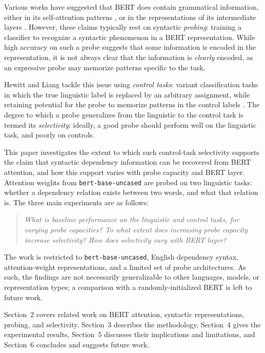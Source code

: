 \documentclass[12pt,a4paper]{article}
\begin{document}
Various works have suggested that BERT does contain grammatical information, either in its self-attention patterns \cite{clark2019what}, or in the representations of its intermediate layers \cite{tenney2019bert}. However, these claims typically rest on syntactic \emph{probing}: training a classifier to recognize a syntactic phenomenon in a BERT representation. While high accuracy on such a probe suggests that some information is encoded in the representation, it is not always clear that the information is \emph{clearly} encoded, as an expressive probe may memorize patterns specific to the task.

Hewitt and Liang tackle this issue using \emph{control tasks}: variant classification tasks in which the true linguistic label is replaced by an arbitrary assignment, while retaining potential for the probe to memorize patterns in the control labels \cite{hewitt2019designing}. The degree to which a probe generalizes from the linguistic to the control task is termed its \emph{selectivity}: ideally, a good probe should perform well on the linguistic task, and poorly on controls.

This paper investigates the extent to which such control-task selectivity supports the claim that syntactic dependency information can be recovered from BERT attention, and how this support varies with probe capacity and BERT layer. Attention weights from \texttt{bert-base-uncased} are probed on two linguistic tasks: whether a dependency relation exists between two words, and what that relation is. The three main experiments are as follows:

\begin{quote}

\textit{What is baseline performance on the linguistic and control tasks, for varying probe capacities? To what extent does increasing probe capacity increase selectivity? How does selectivity vary with BERT layer?}

\end{quote}

The work is restricted to \texttt{bert-base-uncased}, English dependency syntax, attention-weight representations, and a limited set of probe architectures. As such, the findings are not necessarily generalizable to other languages, models, or representation types; a comparison with a randomly-initialized BERT is left to future work.

Section~2 covers related work on BERT attention, syntactic representations, probing, and selectivity. Section~3 describes the methodology, Section~4 gives the experimental results, Section~5 discusses their implications and limitations, and Section~6 concludes and suggests future work.
\end{document}
